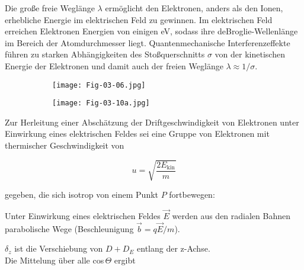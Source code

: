 Die große freie Weglänge $\lambda$ ermöglicht den Elektronen, anders als den Ionen, erhebliche
Energie im elektrischen Feld zu gewinnen. Im elektrischen Feld erreichen Elektronen Energien von
einigen eV, sodass ihre deBroglie-Wellenlänge im Bereich der Atomdurchmesser liegt.
Quantenmechanische Interferenzeffekte führen zu starken Abhängigkeiten des Stoßquerschnitts $\sigma$
von der kinetischen Energie der Elektronen und damit auch der freien Weglänge $\lambda\approx
1/\sigma$.


\begin{figure}[htbp]
	\begin{minipage}[b]{0.65\textwidth}
		\begin{figure}[H]
		\centering
		\texttt{[image: Fig-03-06.jpg]}
		\end{figure}
	\end{minipage}
	\hspace{0.5cm}
	\begin{minipage}[b]{0.25\textwidth}
		\begin{figure}[H]
		\centering
		\texttt{[image: Fig-03-10a.jpg]}
		\end{figure}
	\end{minipage} 
\end{figure}

Zur Herleitung einer Abschätzung der Driftgeschwindigkeit von Elektronen unter Einwirkung eines
elektrischen Feldes sei eine Gruppe von Elektronen mit thermischer Geschwindigkeit von

\[u=\sqrt{\frac{2E_{\text{kin}}}{m}}  \]

gegeben, die sich isotrop von einem Punkt $P$ fortbewegen:

\begin{figure}[H]
	\centering
	
\end{figure}
		
Unter Einwirkung eines elektrischen Feldes $\vec{E}$ werden aus den radialen Bahnen parabolische
Wege (Beschleunigung $\vec{b}=q\vec{E}/m$).

\begin{figure}[H]
	\centering
	
\end{figure}

$\delta_z$ ist die Verschiebung von $D+D_E$ entlang der z-Achse.
\\
Die Mittelung über alle cos$\,\Theta$ ergibt


